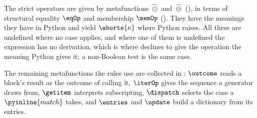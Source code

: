 The strict operators are given by metafunctions $\hat{\odot}$ and $\hat{\ominus}$ (), in
terms of structural equality $\eqOp$ and membership $\memOp$ (). They have
the meanings they have in Python and yield $\aborts{\kappa}$ where Python raises. All three are undefined
where no case applies, and where one of them is undefined the expression has no derivation, which is where
\PurePy declines to give the operation the meaning Python gives it; a non-Boolean test is the same case.





The remaining metafunctions the rules use are collected in : $\outcome$ reads a
block's result as the outcome of calling it, $\iterOp$ gives the sequence a generator draws from, $\getitem$
interprets subscripting, $\dispatch$ selects the case a $\pyinline{match}$ takes, and $\entries$ and
$\update$ build a dictionary from its entries.


